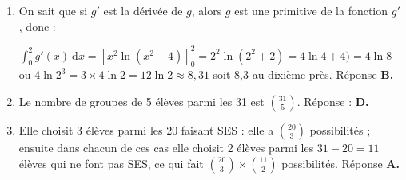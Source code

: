 \documentclass[10pt]{article}
\begin{document}
\begin{enumerate}
Le dessin est clair : la fonction est positive sur l'intervalle[1~;~5] ; l'intégrale est (en unités d'aire) la mesure de la surface limitée par la représentation graphique de $f$, l'axe des abscisses et les droites d'équations $x = 1$ et $x = 5$.

La surface grise contient les 5 carreaux hachurés et est inscrite dans le polygone de 10 unités en bleu. Réponse \textbf{C.}
\item 









On sait que si $g'$ est la dérivée de $g$, alors $g$ est une primitive de la fonction $g'$, donc :

$\displaystyle\int_0^2 g'(x)\:\text{d}x = \left[x^2 \ln \left(x^2 + 4\right)\right]_0^2 = 2^2\ln \left(2^2 + 2 \right) = 4\ln 4 + 4)  = 4\ln 8$ ou $4\ln 2^3 = 3 \times 4 \ln 2 = 12\ln 2 \approx 8,31$ soit 8,3 au dixième près. Réponse \textbf{B.}
	\smallskip
	
\item 
	









Le nombre de groupes de 5 élèves parmi les 31 est $\displaystyle\binom{31}{5}$. Réponse : \textbf{D.}
	\item 
	








	







Elle choisit 3 élèves parmi les 20 faisant SES : elle a $\displaystyle\binom{20}{3}$ possibilités ; ensuite dans chacun de ces cas elle choisit 2 élèves parmi les $31 - 20 = 11$ élèves qui ne font pas SES, ce qui fait $\displaystyle\binom{20}{3} \times \binom{11}{2}$ possibilités. Réponse \textbf{A.}
\end{enumerate}

\bigskip
\end{document}
